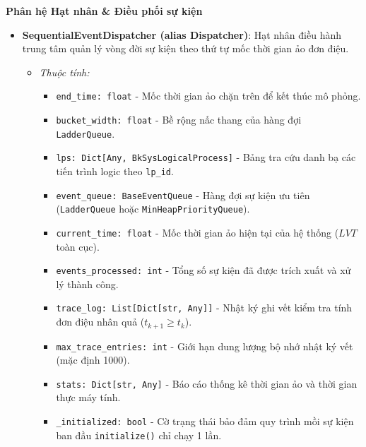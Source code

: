 \textbf{\color{red}Phân hệ Hạt nhân \& Điều phối sự kiện}
\begin{itemize}[leftmargin=1.5em, itemsep=8pt]
\item \textbf{SequentialEventDispatcher (alias Dispatcher)}: Hạt nhân điều hành trung tâm quản lý vòng đời sự kiện theo thứ tự mốc thời gian ảo đơn điệu.

\begin{itemize}[leftmargin=1.2em, label={}, itemsep=3pt]
\item[\textendash] \textit{Thuộc tính:}
\begin{itemize}[leftmargin=1.5em, label=+, itemsep=2pt]
\item \texttt{end\_time: float} - Mốc thời gian ảo chặn trên để kết thúc mô phỏng.
\item \texttt{bucket\_width: float} - Bề rộng nấc thang của hàng đợi \texttt{LadderQueue}.
\item \texttt{lps: Dict[Any, BkSysLogicalProcess]} - Bảng tra cứu danh bạ các tiến trình logic theo \texttt{lp\_id}.
\item \texttt{event\_queue: BaseEventQueue} - Hàng đợi sự kiện ưu tiên (\texttt{LadderQueue} hoặc \texttt{MinHeapPriorityQueue}).
\item \texttt{current\_time: float} - Mốc thời gian ảo hiện tại của hệ thống ($LVT$ toàn cục).
\item \texttt{events\_processed: int} - Tổng số sự kiện đã được trích xuất và xử lý thành công.
\item \texttt{trace\_log: List[Dict[str, Any]]} - Nhật ký ghi vết kiểm tra tính đơn điệu nhân quả ($t_{k+1} \ge t_k$).
\item \texttt{max\_trace\_entries: int} - Giới hạn dung lượng bộ nhớ nhật ký vết (mặc định 1000).
\item \texttt{stats: Dict[str, Any]} - Báo cáo thống kê thời gian ảo và thời gian thực máy tính.
\item \texttt{\_initialized: bool} - Cờ trạng thái bảo đảm quy trình mồi sự kiện ban đầu \texttt{initialize()} chỉ chạy 1 lần.
\end{itemize}


\end{itemize}
\end{itemize}

